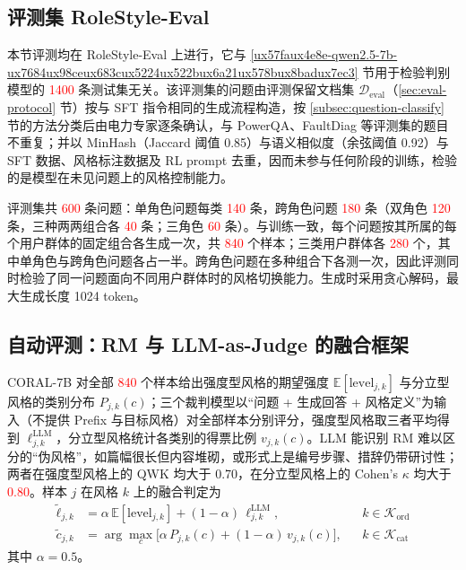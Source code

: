 \documentclass[fontset=fandol,type=master,campus=shenzhen,etitleauto=true]{hithesisbook}
\newcommand{\rev}[1]{\textcolor{red}{#1}}
\begin{document}
\subsection{评测集 RoleStyle-Eval}\label{subsec:scenariostyle-eval}

本节评测均在 RoleStyle-Eval 上进行，它与 \ref{ux57faux4e8e-qwen2.5-7b-ux7684ux98ceux683cux5224ux522bux6a21ux578bux8badux7ec3} 节用于检验判别模型的 \rev{1400} 条测试集无关。该评测集的问题由评测保留文档集 $\mathcal{D}_{\text{eval}}$（\ref{sec:eval-protocol} 节）按与 SFT 指令相同的生成流程构造，按 \ref{subsec:question-classify} 节的方法分类后由电力专家逐条确认，与 PowerQA、FaultDiag 等评测集的题目不重复；并以 MinHash（Jaccard 阈值 0.85）与语义相似度（余弦阈值 0.92）与 SFT 数据、风格标注数据及 RL prompt 去重，因而未参与任何阶段的训练，检验的是模型在未见问题上的风格控制能力。

评测集共 \rev{600} 条问题：单角色问题每类 \rev{140} 条，跨角色问题 \rev{180} 条（双角色 \rev{120} 条，三种两两组合各 \rev{40} 条；三角色 \rev{60} 条）。与训练一致，每个问题按其所属的每个用户群体的固定组合各生成一次，共 \rev{840} 个样本；三类用户群体各 \rev{280} 个，其中单角色与跨角色问题各占一半。跨角色问题在多种组合下各测一次，因此评测同时检验了同一问题面向不同用户群体时的风格切换能力。生成时采用贪心解码，最大生成长度 1024 token。

\subsection{自动评测：RM 与 LLM-as-Judge 的融合框架}\label{ux81eaux52a8ux8bc4ux6d4b}

CORAL-7B 对全部 \rev{840} 个样本给出强度型风格的期望强度 $\mathbb{E}[\text{level}_{j,k}]$ 与分立型风格的类别分布 $P_{j,k}(c)$；三个裁判模型以“问题 + 生成回答 + 风格定义”为输入（不提供 Prefix 与目标风格）对全部样本分别评分，强度型风格取三者平均得到 $\ell^{\text{LLM}}_{j,k}$，分立型风格统计各类别的得票比例 $v_{j,k}(c)$。LLM 能识别 RM 难以区分的“伪风格”，如篇幅很长但内容堆砌，或形式上是编号步骤、措辞仍带研讨性；两者在强度型风格上的 QWK 均大于 0.70，在分立型风格上的 Cohen's $\kappa$ 均大于 \rev{0.80}。样本 $j$ 在风格 $k$ 上的融合判定为
\begin{equation}\label{eq:fused-level}
\begin{aligned}
\tilde{\ell}_{j,k} &= \alpha\, \mathbb{E}[\text{level}_{j,k}] + (1 - \alpha)\, \ell^{\text{LLM}}_{j,k}, && k \in \mathcal{K}_{\text{ord}} \\
\tilde{c}_{j,k} &= \arg\max_{c} \bigl[ \alpha\, P_{j,k}(c) + (1 - \alpha)\, v_{j,k}(c) \bigr], && k \in \mathcal{K}_{\text{cat}}
\end{aligned}
\end{equation}
其中 $\alpha = 0.5$。
\end{document}
